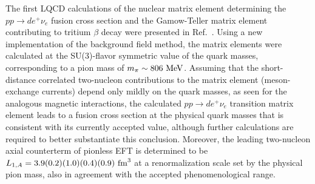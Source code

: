 The first LQCD calculations of the nuclear matrix element determining the $pp\rightarrow d e^+\nu_e$ fusion cross section and the Gamow-Teller matrix element contributing to tritium $\beta$ decay were presented in Ref.~\cite{Savage:2016kon}.
Using a new implementation of the background field method,
the matrix elements were calculated at the SU(3)-flavor symmetric 
value of the quark masses, corresponding to a pion mass of $m_\pi\sim 806~{\rm MeV}$. Assuming that the short-distance correlated two-nucleon contributions to the matrix element 
(meson-exchange currents) depend only mildly on the quark masses, as seen for the analogous magnetic interactions, 
the calculated $pp\rightarrow d e^+\nu_e$ transition matrix element leads to a fusion cross section at the physical quark 
masses that is consistent with its currently accepted value, although further calculations are required to  better substantiate this conclusion. Moreover, the leading two-nucleon axial counterterm of pionless EFT is determined to 
be $L_{1,A} = 3.9(0.2)(1.0)(0.4)(0.9)~{\rm fm}^3$ at a renormalization scale set by the physical pion mass, 
also in agreement with the accepted phenomenological range. 

